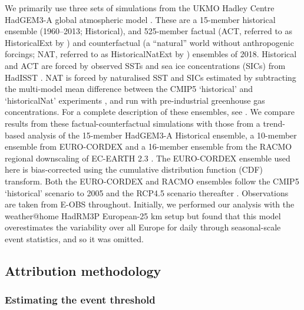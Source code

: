     We primarily use three sets of simulations from the UKMO Hadley Centre HadGEM3-A global atmospheric model \citep{christidis_new_2013,ciavarella_upgrade_2018}. These are a 15-member historical ensemble (1960--2013; Historical), and 525-member factual (ACT, referred to as HistoricalExt by \citeauthor{ciavarella_upgrade_2018}) and counterfactual (a “natural” world without anthropogenic forcings; NAT, referred to as HistoricalNatExt by \citeauthor{ciavarella_upgrade_2018}) ensembles of 2018. Historical and ACT are forced by observed SSTs and sea ice concentrations (SICs) from HadISST \citep{rayner_global_2003}. NAT is forced by naturalised SST and SICs estimated by subtracting the multi-model mean difference between the CMIP5 `historical' and `historicalNat' experiments \citep{taylor_overview_2012}, and run with pre-industrial greenhouse gas concentrations. For a complete description of these ensembles, see \citet{ciavarella_upgrade_2018}. We compare results from these factual-counterfactual simulations with those from a trend-based analysis of the 15-member HadGEM3-A Historical ensemble, a 10-member ensemble from EURO-CORDEX \citep[1971--2018;][]{vautard_simulation_2013,jacob_euro-cordex_2014,vrac_influence_2017} and a 16-member ensemble from the RACMO regional downscaling of EC-EARTH 2.3 \citep[1950--2018;][]{aalbers_local-scale_2018,lenderink_preparing_2014}. The EURO-CORDEX ensemble used here is bias-corrected using the cumulative distribution function (CDF) transform. Both the EURO-CORDEX and RACMO ensembles follow the CMIP5 `historical' scenario to 2005 and the RCP4.5 scenario thereafter \citep{taylor_overview_2012,thomson_rcp45_2011}. Observations are taken from E-OBS \citep[1950--2018;][]{cornes_ensemble_2018} throughout. Initially, we performed our analysis with the weather@home HadRM3P European-25 km setup \citep{massey_weatherhome-development_2015} but found that this model overestimates the variability over all Europe for daily through seasonal-scale event statistics, and so it was omitted.

  \subsection*{Attribution methodology}

    \subsubsection*{Estimating the event threshold}

